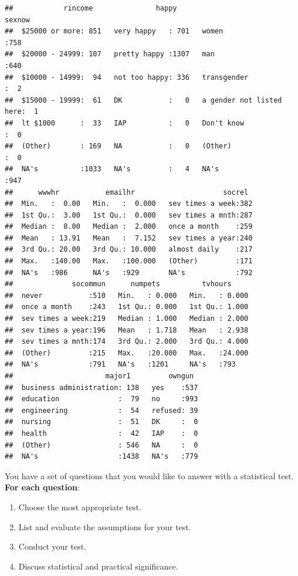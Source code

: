 \documentclass[
]{book}
\providecommand{\tightlist}{%
  \setlength{\itemsep}{0pt}\setlength{\parskip}{0pt}}
\theoremstyle{definition}
\theoremstyle{definition}
\theoremstyle{definition}
\theoremstyle{definition}
\theoremstyle{remark}
\begin{document}
\begin{verbatim}
##            rincome               happy                           sexnow   
##  $25000 or more: 851   very happy   : 701   women                   :758  
##  $20000 - 24999: 107   pretty happy :1307   man                     :640  
##  $10000 - 14999:  94   not too happy: 336   transgender             :  2  
##  $15000 - 19999:  61   DK           :   0   a gender not listed here:  1  
##  lt $1000      :  33   IAP          :   0   Don't know              :  0  
##  (Other)       : 169   NA           :   0   (Other)                 :  0  
##  NA's          :1033   NA's         :   4   NA's                    :947  
##      wwwhr           emailhr                     socrel   
##  Min.   :  0.00   Min.   :  0.000   sev times a week:382  
##  1st Qu.:  3.00   1st Qu.:  0.000   sev times a mnth:287  
##  Median :  8.00   Median :  2.000   once a month    :259  
##  Mean   : 13.91   Mean   :  7.152   sev times a year:240  
##  3rd Qu.: 20.00   3rd Qu.: 10.000   almost daily    :217  
##  Max.   :140.00   Max.   :100.000   (Other)         :171  
##  NA's   :986      NA's   :929       NA's            :792  
##              socommun      numpets          tvhours      
##  never           :510   Min.   : 0.000   Min.   : 0.000  
##  once a month    :243   1st Qu.: 0.000   1st Qu.: 1.000  
##  sev times a week:219   Median : 1.000   Median : 2.000  
##  sev times a year:196   Mean   : 1.718   Mean   : 2.938  
##  sev times a mnth:174   3rd Qu.: 2.000   3rd Qu.: 4.000  
##  (Other)         :215   Max.   :20.000   Max.   :24.000  
##  NA's            :791   NA's   :1201     NA's   :793     
##                      major1         owngun   
##  business administration: 138   yes    :537  
##  education              :  79   no     :993  
##  engineering            :  54   refused: 39  
##  nursing                :  51   DK     :  0  
##  health                 :  42   IAP    :  0  
##  (Other)                : 546   NA     :  0  
##  NA's                   :1438   NA's   :779
\end{verbatim}

You have a set of questions that you would like to answer with a statistical test. \textbf{For each question}:

\begin{enumerate}
\def\labelenumi{\arabic{enumi}.}
\tightlist
\item
  Choose the most appropriate test.
\item
  List and evaluate the assumptions for your test.
\item
  Conduct your test.
\item
  Discuss statistical and practical significance.
\end{enumerate}
\end{document}
